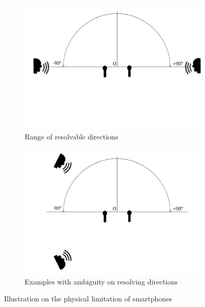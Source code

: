 \documentclass[a4paper,twoside,12pt,hidelinks]{article}
\begin{document}
\begin{figure}[H]
\centering
\begin{subfigure}[t]{0.49\textwidth}
\includegraphics[width=\textwidth]{microphone1}
\caption{Range of resolvable directions}
\label{fig:resolvemicrophone}
\end{subfigure}
\begin{subfigure}[t]{0.49\textwidth}
\includegraphics[width=\textwidth]{microphone2}
\caption{Examples with ambiguity on resolving directions}
\label{fig:unresolvablemicrophone}
\end{subfigure}
\caption{Illustration on the physical limitation of smartphones}
\label{fig:microphone}
\end{figure}
\end{document}
